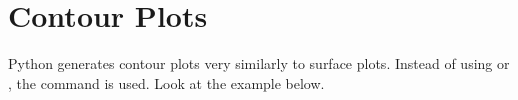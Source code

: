 %
%
%
%
%
%
%
%
%
%

\section{Contour Plots}

Python generates contour plots very similarly to surface
plots.  Instead of using  or ,
the command  is used.  Look at the example below.


